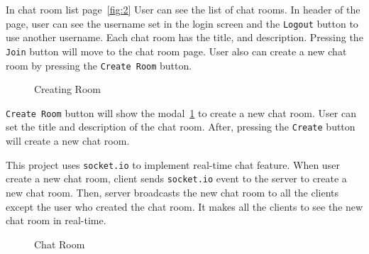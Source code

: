 \documentclass[11pt]{article}
\begin{document}
In chat room list page~\ref{fig:2} User can see the list of chat rooms.
In header of the page, user can see the username set in the login screen and the \texttt{Logout} button to use another username.
Each chat room has the title, and description. Pressing the \texttt{Join} button will move to the chat room page.
User also can create a new chat room by pressing the \texttt{Create Room} button.

\begin{figure}[H]
  \centering
  \caption{Creating Room}
  \label{fig:3}
\end{figure}

\texttt{Create Room} button will show the modal~\ref{fig:3} to create a new chat room.
User can set the title and description of the chat room.
After, pressing the \texttt{Create} button will create a new chat room.

This project uses \texttt{socket.io} to implement real-time chat feature.
When user create a new chat room, client sends \texttt{socket.io} event to the server to create a new chat room.
Then, server broadcasts the new chat room to all the clients except the user who created the chat room.
It makes all the clients to see the new chat room in real-time.

\begin{figure}[H]
  \centering
  \caption{Chat Room}
  \label{fig:4}
\end{figure}
\end{document}
